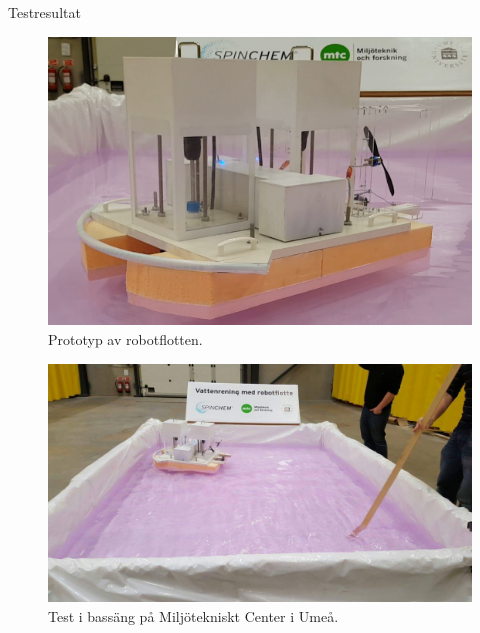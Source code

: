 \documentclass[final]{beamer}
\newlength{\onecolwid}
\begin{document}
\begin{frame}[t]
\begin{columns}[t, totalwidth=\textwidth]
\begin{column}{\onecolwid}
\begin{block}{Testresultat}
        \vskip 2cm
        \begin{figure}[H]
          \centering
          \includegraphics[width=\linewidth]{figures/flotte.png}
          \caption{Prototyp av robotflotten.}
        \end{figure}

        \vskip 2cm
        \begin{figure}[H]
          \centering
          \includegraphics[width=\linewidth]{figures/pool.jpeg}
          \caption{Test i bassäng på Miljötekniskt Center i Umeå.}
        \end{figure}
      \end{block}

    \end{column}

  \end{columns} %

\end{frame} %
\end{document}
